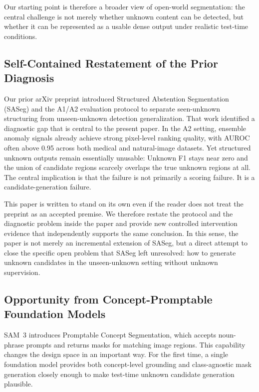 \documentclass[a4paper,fleqn]{cas-dc}
\newcommand{\samthree}{SAM~3}
\begin{document}
Our starting point is therefore a broader view of open-world segmentation: the central challenge is not merely whether unknown content can be detected, but whether it can be represented as a usable dense output under realistic test-time conditions.


\subsection{Self-Contained Restatement of the Prior Diagnosis}
\label{sec:intro:prior}

Our prior arXiv preprint introduced Structured Abstention Segmentation (SASeg) and the A1/A2 evaluation protocol to separate seen-unknown structuring from unseen-unknown detection generalization. That work identified a diagnostic gap that is central to the present paper. In the A2 setting, ensemble anomaly signals already achieve strong pixel-level ranking quality, with AUROC often above 0.95 across both medical and natural-image datasets. Yet structured unknown outputs remain essentially unusable: Unknown F1 stays near zero and the union of candidate regions scarcely overlaps the true unknown regions at all. The central implication is that the failure is not primarily a scoring failure. It is a candidate-generation failure.

This paper is written to stand on its own even if the reader does not treat the preprint as an accepted premise. We therefore restate the protocol and the diagnostic problem inside the paper and provide new controlled intervention evidence that independently supports the same conclusion. In this sense, the paper is not merely an incremental extension of SASeg, but a direct attempt to close the specific open problem that SASeg left unresolved: how to generate unknown candidates in the unseen-unknown setting without unknown supervision.

\subsection{Opportunity from Concept-Promptable Foundation Models}
\label{sec:intro:opportunity}

\samthree{} introduces Promptable Concept Segmentation, which accepts noun-phrase prompts and returns masks for matching image regions. This capability changes the design space in an important way. For the first time, a single foundation model provides both concept-level grounding and class-agnostic mask generation closely enough to make test-time unknown candidate generation plausible.
\end{document}
